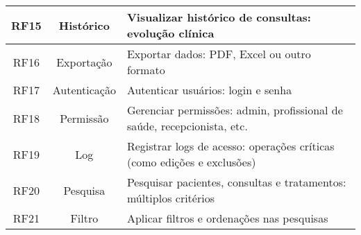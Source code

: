 \begin{quadro}
\begin{tabular}{|c|c|p{10cm}|}
        RF15   & Histórico    & Visualizar histórico de consultas: evolução clínica \\ \hline
        RF16   & Exportação   & Exportar dados: PDF, Excel ou outro formato \\ \hline
        RF17   & Autenticação & Autenticar usuários: login e senha \\ \hline
        RF18   & Permissão    & Gerenciar permissões: admin, profissional de saúde, recepcionista, etc. \\ \hline
        RF19   & Log          & Registrar logs de acesso: operações críticas (como edições e exclusões) \\ \hline
        RF20   & Pesquisa     & Pesquisar pacientes, consultas e tratamentos: múltiplos critérios \\ \hline
        RF21   & Filtro       & Aplicar filtros e ordenações nas pesquisas \\ \hline
    \end{tabular}
\end{quadro}
